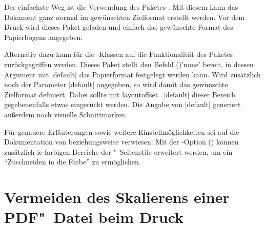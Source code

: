 Der einfachste Weg ist die Verwendung des Paketes . Mit diesem 
kann das Dokument ganz normal im gewünschten Zielformat erstellt werden. Vor 
dem Druck wird dieses Paket geladen und einfach das gewünschte Format des 
Papierbogens angegeben. 
%
\begin{quoting}[rightmargin=0pt]
\end{quoting}
%
Alternativ dazu kann für die \TUDScript-Klassen auf die Funktionalität des 
Paketes  zurückgegriffen werden. Dieses Paket stellt den 
Befehl ()'none' bereit, in dessen Argument mit
|default|
das Papierformat festgelegt werden kann. Wird zusätzlich noch der Parameter 
|default|
angegeben, so wird damit das gewünschte Zielformat definiert. Dabei sollte mit
%
{layoutoffset=}|default|
dieser Bereich gegebenenfalls etwas eingerückt werden. Die Angabe von 
|default|
generiert außerdem noch visuelle Schnittmarken. 
%
\begin{quoting}[rightmargin=0pt]
\end{quoting}
%
Für genauere Erläuterungen sowie weitere Einstellmöglichkeiten sei auf die 
Dokumentation von  beziehungsweise  verwiesen.
Mit der \TUDScript-Option () können
zusätzlich ie farbigen Bereiche der "~Seitenstile 
erweitert werden, um ein \enquote{Zuschneiden in die Farbe} zu ermöglichen.



\section{%
  Vermeiden des Skalierens einer PDF"~Datei beim Druck%
}

